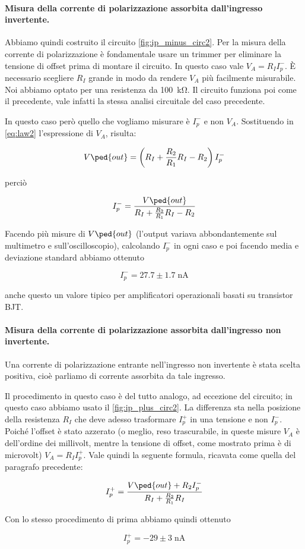 \paragraph{Misura della corrente di polarizzazione assorbita dall'ingresso invertente.}

Abbiamo quindi costruito il circuito \ref{fig:ip_minus_circ2}. Per la misura della corrente di polarizzazione
è fondamentale usare un trimmer per eliminare la tensione di offset prima di montare il circuito.
In questo caso vale $V_A = R_I I_p^-$. È necessario scegliere $R_I$ grande in modo da rendere $V_A$ più facilmente
misurabile. Noi abbiamo optato per una resistenza da \SI{100}{\kilo\ohm}. Il circuito funziona poi come il
precedente, vale infatti la stessa analisi circuitale del caso precedente.

In questo caso però quello che vogliamo misurare è $I_p^-$ e non $V_A$. Sostituendo in \eqref{eq:law2}
l'espressione di $V_A$, risulta:

\begin{equation}
    V\ped{out} = \left( R_I + \frac{R_2}{R_1} R_I - R_2 \right) I_p^-
\end{equation}

perciò

\begin{equation}
    I_p^- = \frac{V\ped{out}}{ R_I + \frac{R_2}{R_1} R_I - R_2}
\end{equation}

Facendo più misure di $V\ped{out}$ (l'output variava abbondantemente sul multimetro e sull'oscilloscopio),
calcolando $I_p^-$ in ogni caso e poi facendo media e deviazione standard abbiamo ottenuto

\begin{equation}
    I_p^- = 27.7 \pm 1.7 \; \si{\nano\ampere}
\end{equation}

anche questo un valore tipico per amplificatori operazionali basati su transistor BJT.

\paragraph{Misura della corrente di polarizzazione assorbita dall'ingresso non invertente.}

Una corrente di polarizzazione entrante nell'ingresso non invertente è stata scelta positiva,
cioè parliamo di corrente assorbita da tale ingresso. 

Il procedimento in questo caso è del tutto analogo, ad eccezione del circuito; in questo caso
abbiamo usato il \ref{fig:ip_plus_circ2}. La differenza sta nella posizione della resistenza $R_I$
che deve adesso trasformare $I_p^+$ in una tensione e non $I_p^-$. Poiché l'offset è stato azzerato
(o meglio, reso trascurabile, in queste misure $V_A$ è dell'ordine dei millivolt, mentre la tensione
di offset, come mostrato prima è di microvolt) $V_A = R_I I_p^+$. Vale quindi la seguente formula, ricavata
come quella del paragrafo precedente:

\begin{equation}
    I_p^+ = \frac{V\ped{out} + R_2 I_p^-}{ R_I + \frac{R_2}{R_1} R_I}
\end{equation}

Con lo stesso procedimento di prima abbiamo quindi ottenuto

\begin{equation}
    I_p^+ = -29 \pm 3 \; \si{\nano\ampere}
\end{equation}
